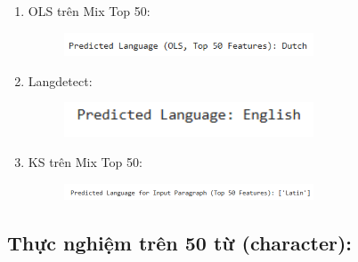 \begin{enumerate}
\begin{figure}[H]
\end{figure}
    \item OLS trên Mix Top 50:
    \begin{figure}[H]
    \centering
    \includegraphics[width=0.7\textwidth]{img/docspics/Picture51.png}
\end{figure}
    \item Langdetect:
    \begin{figure}[H]
    \centering
    \includegraphics[width=0.7\textwidth]{img/docspics/Picture52.png}
\end{figure}
    \item KS trên Mix Top 50:
    \begin{figure}[H]
    \centering
    \includegraphics[width=0.7\textwidth]{img/docspics/Picture53.png}
\end{figure}
\end{enumerate}

\subsection{Thực nghiệm trên 50 từ (character):}

